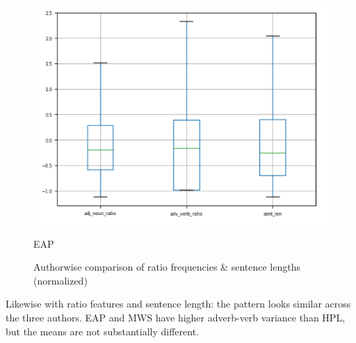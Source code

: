 \documentclass[8pt]{article}
\begin{document}
\begin{figure}[h]
\begin{multicols}{3}
      \includegraphics[width=\linewidth]{images/ratio_eap.png}\par\caption{EAP}
  \end{multicols} 

  \caption{Authorwise comparison of ratio frequencies \& sentence lengths (normalized)}
  \label{fig:ratio}

\end{figure}

Likewise with ratio features and sentence length: the pattern looks similar across the three authors. EAP and MWS have higher adverb-verb variance than HPL, but the means are not substantially different.
\end{document}
